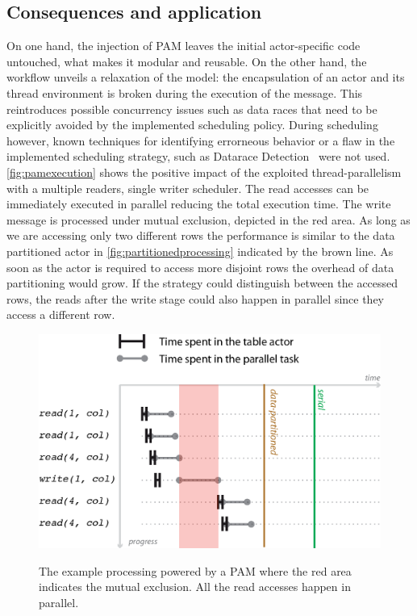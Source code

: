 \documentclass[11pt, journal]{IEEEtran}
\begin{document}
\subsection{Consequences and application}\label{sec:pamconsequencesandapplication}
On one hand, the injection of PAM leaves the initial actor-specific code untouched, what makes it modular and reusable. On the other hand, the workflow unveils a relaxation of the model: the encapsulation of an actor and its thread environment is broken during the execution of the message. This reintroduces possible concurrency issues such as data races that need to be explicitly avoided by the implemented scheduling policy. During scheduling however, known techniques for identifying errorneous behavior or a flaw in the implemented scheduling strategy, such as Datarace Detection~\cite{Cheng98a, Choi:2002:EPD:543552.512560} were not used. \autoref{fig:pamexecution} shows the positive impact of the exploited thread-parallelism with a multiple readers, single writer scheduler. The read accesses can be immediately executed in parallel reducing the total execution time. The write message is processed under mutual exclusion, depicted in the red area. As long as we are accessing only two different rows the performance is similar to the data partitioned actor in \autoref{fig:partitionedprocessing} indicated by the brown line. As soon as the actor is required to access more disjoint rows the overhead of data partitioning would grow. If the strategy could distinguish between the accessed rows, the reads after the write stage could also happen in parallel since they access a different row.

\begin{figure}[!htbp]
\centering
\includegraphics[width=\columnwidth]{figures/processing-03.eps}
\begin{caption}
	{The example processing powered by a PAM where the red area indicates the mutual exclusion. All the read accesses happen in parallel.} \label{fig:pamexecution}
\end{caption}
\end{figure}
\end{document}
